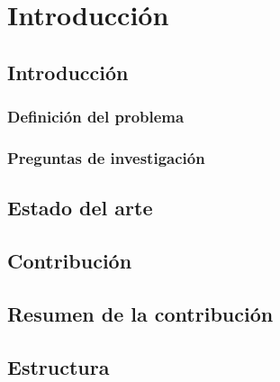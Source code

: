 % 
% 
% 
% 
% 
% 
% 
% 

\chapter{Introducción}
\label{cha:introduccion}


\section{Introducción}
\label{sec:introduccion}

\subsection{Definición del problema}
\label{sec:definicion-problema}

\subsection{Preguntas de investigación}
\label{sec:preguntas-investigacion}

\section{Estado del arte}
\label{sec:estado-arte}

\section{Contribución}
\label{sec:contribucion}

\section{Resumen de la contribución}
\label{sec:resumen-contribucion}

\section{Estructura}
\label{sec:estructura}










